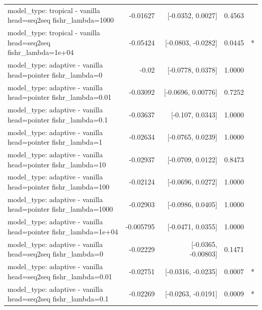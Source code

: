 \documentclass[10pt]{article}
\makeatletter
\newcommand{\stackcell}[1]{\begin{tabular}[t]{@{}l@{}}#1\end{tabular}}
\makeatother
\begin{document}
{\begin{longtable}{lrrrl}
\stackcell{model\_type: tropical - vanilla\\\footnotesize head=seq2seq fishr\_lambda=1000 } & -0.01627 & [-0.0352, 0.0027] & 0.4563 & \\
\stackcell{model\_type: tropical - vanilla\\\footnotesize head=seq2seq fishr\_lambda=1e+04 } & -0.05424 & [-0.0803, -0.0282] & 0.0445 & *\\
\stackcell{model\_type: adaptive - vanilla\\\footnotesize head=pointer fishr\_lambda=0 } & -0.02 & [-0.0778, 0.0378] & 1.0000 & \\
\stackcell{model\_type: adaptive - vanilla\\\footnotesize head=pointer fishr\_lambda=0.01 } & -0.03092 & [-0.0696, 0.00776] & 0.7252 & \\
\stackcell{model\_type: adaptive - vanilla\\\footnotesize head=pointer fishr\_lambda=0.1 } & -0.03637 & [-0.107, 0.0343] & 1.0000 & \\
\stackcell{model\_type: adaptive - vanilla\\\footnotesize head=pointer fishr\_lambda=1 } & -0.02634 & [-0.0765, 0.0239] & 1.0000 & \\
\stackcell{model\_type: adaptive - vanilla\\\footnotesize head=pointer fishr\_lambda=10 } & -0.02937 & [-0.0709, 0.0122] & 0.8473 & \\
\stackcell{model\_type: adaptive - vanilla\\\footnotesize head=pointer fishr\_lambda=100 } & -0.02124 & [-0.0696, 0.0272] & 1.0000 & \\
\stackcell{model\_type: adaptive - vanilla\\\footnotesize head=pointer fishr\_lambda=1000 } & -0.02903 & [-0.0986, 0.0405] & 1.0000 & \\
\stackcell{model\_type: adaptive - vanilla\\\footnotesize head=pointer fishr\_lambda=1e+04 } & -0.005795 & [-0.0471, 0.0355] & 1.0000 & \\
\stackcell{model\_type: adaptive - vanilla\\\footnotesize head=seq2seq fishr\_lambda=0 } & -0.02229 & [-0.0365, -0.00803] & 0.1471 & \\
\stackcell{model\_type: adaptive - vanilla\\\footnotesize head=seq2seq fishr\_lambda=0.01 } & -0.02751 & [-0.0316, -0.0235] & 0.0007 & *\\
\stackcell{model\_type: adaptive - vanilla\\\footnotesize head=seq2seq fishr\_lambda=0.1 } & -0.02269 & [-0.0263, -0.0191] & 0.0009 & *\\

\end{longtable}}
\end{document}
